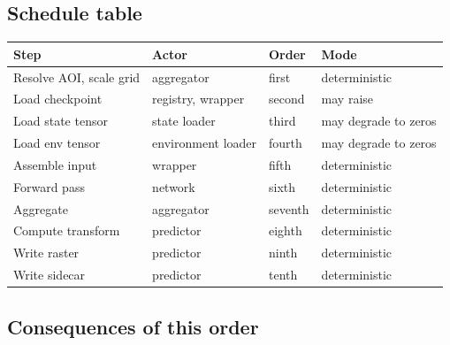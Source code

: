 \documentclass[11pt,a4paper]{article}
\begin{document}
\subsection{Schedule table}

\begin{center}
\begin{longtable}{@{}llll@{}}
\toprule
Step & Actor & Order & Mode \\
\midrule
\endhead
Resolve AOI, scale grid & aggregator & first & deterministic \\
Load checkpoint & registry, wrapper & second & may raise \\
Load state tensor & state loader & third & may degrade to zeros \\
Load env tensor & environment loader & fourth & may degrade to zeros \\
Assemble input & wrapper & fifth & deterministic \\
Forward pass & network & sixth & deterministic \\
Aggregate & aggregator & seventh & deterministic \\
Compute transform & predictor & eighth & deterministic \\
Write raster & predictor & ninth & deterministic \\
Write sidecar & predictor & tenth & deterministic \\
\bottomrule
\end{longtable}
\end{center}

\subsection{Consequences of this order}
\end{document}
